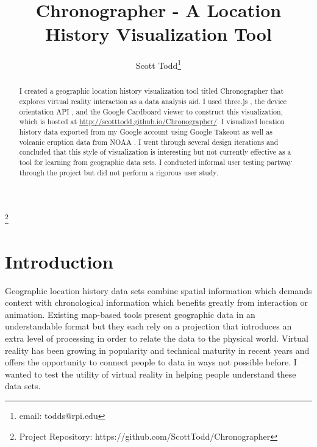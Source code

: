 \documentclass[conference]{acmsiggraph}
\title{Chronographer - A Location History Visualization Tool}
\author{Scott Todd\thanks{email: todds@rpi.edu}}
\newcommand\blfootnote[1]{%
  \begingroup
  \renewcommand\thefootnote{}\footnote{#1}%
  \addtocounter{footnote}{-1}%
  \endgroup
}
\begin{document}

\maketitle


\begin{abstract}

I created a geographic location history visualization tool titled Chronographer
that explores virtual reality interaction as a data analysis aid. I used
three.js \cite{three.js}, the device orientation API
\cite{Mozilla:DeviceOrientation}, and the Google Cardboard
\cite{Google:Cardboard} viewer to construct this visualization, which is hosted
at \url{http://scotttodd.github.io/Chronographer/}. I visualized location
history data exported from my Google account using Google Takeout
\cite{Google:Takeout} as well as volcanic eruption data from NOAA
\cite{NOAA:Volcano}. I went through several design iterations and concluded that
this style of visualization is interesting but not currently effective as a
tool for learning from geographic data sets. I conducted informal user testing
partway through the project but did not perform a rigorous user study.

\end{abstract}

\keywordlist

\TOGlinkslist

\blfootnote{Project Repository: https://github.com/ScottTodd/Chronographer}

\copyrightspace


\section{Introduction}

Geographic location history data sets combine spatial information which demands
context with chronological information which benefits greatly from interaction
or animation. Existing map-based tools present geographic data in an
understandable format but they each rely on a projection that introduces an
extra level of processing in order to relate the data to the physical world.
Virtual reality has been growing in popularity and technical maturity in recent
years and offers the opportunity to connect people to data in ways not possible
before. I wanted to test the utility of virtual reality in helping people
understand these data sets.
\end{document}
